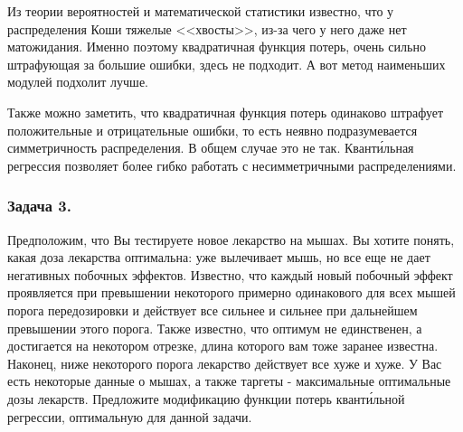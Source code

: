 \begin{solution}
    Из теории вероятностей и математической статистики известно, что у распределения Коши тяжелые <<хвосты>>, из-за чего у него даже нет матожидания. Именно поэтому квадратичная функция потерь, очень сильно штрафующая за большие ошибки, здесь не подходит. А вот метод наименьших модулей подхолит лучше.

    Также можно заметить, что квадратичная функция потерь одинаково штрафует положительные и отрицательные ошибки, то есть неявно подразумевается симметричность распределения. В общем случае это не так. Квант\'{и}льная регрессия позволяет более гибко работать с несимметричными распределениями.
\end{solution}

\subsubsection*{Задача 3.}

Предположим, что Вы тестируете новое лекарство на мышах. Вы хотите понять, какая доза лекарства оптимальна: уже вылечивает мышь, но все еще не дает негативных побочных эффектов. Известно, что каждый новый побочный эффект проявляется при превышении некоторого примерно одинакового для всех мышей порога передозировки и действует все сильнее и сильнее при дальнейшем превышении этого порога. Также известно, что оптимум не единственен, а достигается на некотором отрезке, длина которого вам тоже заранее известна. Наконец, ниже некоторого порога лекарство действует все хуже и хуже. У Вас есть некоторые данные о мышах, а также таргеты - максимальные оптимальные дозы лекарств. Предложите модификацию функции потерь квант\'{и}льной регрессии, оптимальную для данной задачи.

